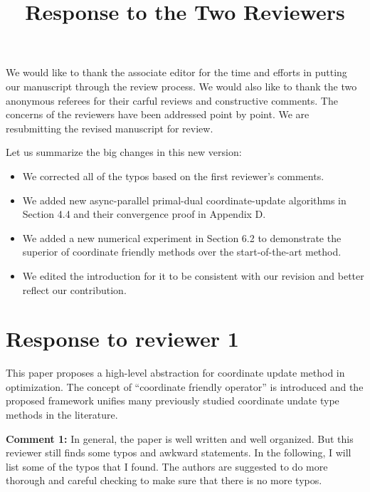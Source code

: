 \documentclass[amsa]{ipart}
\begin{document}
\title{Response to the Two Reviewers}
\vspace{5mm}

We would like to thank the associate editor for the time and efforts in putting our manuscript through the review process. We would also like to thank the two anonymous referees for their carful reviews and constructive comments. The concerns of the reviewers have been addressed point by point. We are resubmitting the revised manuscript for review. 

Let us summarize the big changes in this new version:
\begin{itemize}
\item We corrected all of the typos based on the first reviewer's comments. 
\item We added new async-parallel primal-dual coordinate-update algorithms in Section 4.4 and their convergence proof in Appendix D.
\item We added a new numerical experiment in Section 6.2 to demonstrate the superior of coordinate friendly methods over the start-of-the-art method. 
\item We edited the introduction for it to be consistent with our revision and better reflect our contribution.
\end{itemize}

\section{Response to reviewer 1}
This paper proposes a high-level abstraction for coordinate update method in optimization. The concept of ``coordinate friendly operator'' is introduced and the proposed framework unifies many previously studied coordinate undate type methods in the literature.

\textbf{Comment 1:} In general, the paper is well written and well organized. But this reviewer still finds some typos and awkward statements. In the following, I will list some of the typos that I found. The authors are suggested to do more thorough and careful checking to make sure that there is no more typos.

\end{document}
